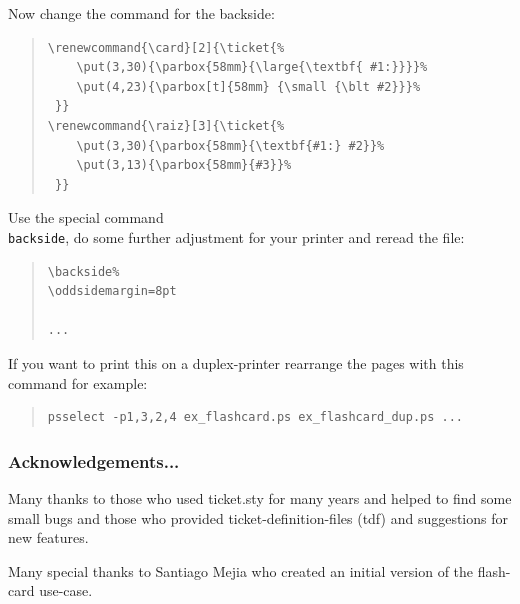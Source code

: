\documentclass[aspectratio=1610,hyperref={pdfpagelabels=false}]{beamer}
\def\code#1{\texttt{#1}}
\newcommand{\ticket}{{\code{ticket.sty}}}
\newcommand{\bs}{{\mtt\\}}
\begin{document}
\begin{frame}[fragile]\vspace*{10mm}
Now change the command for the backside:
\begin{quote}
    \begin{minipage}[t]{0.5\textwidth}
      {\scriptsize
\begin{verbatim}
\renewcommand{\card}[2]{\ticket{%
    \put(3,30){\parbox{58mm}{\large{\textbf{ #1:}}}}%
    \put(4,23){\parbox[t]{58mm} {\small {\blt #2}}}%
 }}
\renewcommand{\raiz}[3]{\ticket{%
    \put(3,30){\parbox{58mm}{\textbf{#1:} #2}}%
    \put(3,13){\parbox{58mm}{#3}}%
 }}
\end{verbatim}
        }
    \end{minipage}
\end{quote}

Use the special command \code{\bs{}backside}, do some further adjustment for your printer and reread the file:
\begin{quote}
    \begin{minipage}[t]{0.5\textwidth}
      {\scriptsize
\begin{verbatim}
\backside%
\oddsidemargin=8pt

...
\end{verbatim}
        }
    \end{minipage}
\end{quote}

If you want to print this on a duplex-printer rearrange the pages with this command for example:
\begin{quote}
    \begin{minipage}[t]{0.5\textwidth}
      {\scriptsize
\begin{verbatim}
psselect -p1,3,2,4 ex_flashcard.ps ex_flashcard_dup.ps ...
\end{verbatim}
        }
    \end{minipage}
\end{quote}
\end{frame}
\begin{frame}
  \frametitle{Acknowledgements...}
  \begin{block}{Many thanks}
  to those who used ticket.sty for many years and helped
  to find some small bugs and those who provided ticket-definition-files (tdf)
  and suggestions for new features.
  \end{block}
  
  Many special thanks to Santiago Mejia who created an initial version
  of the flash-card use-case.
\end{frame}
\end{document}
